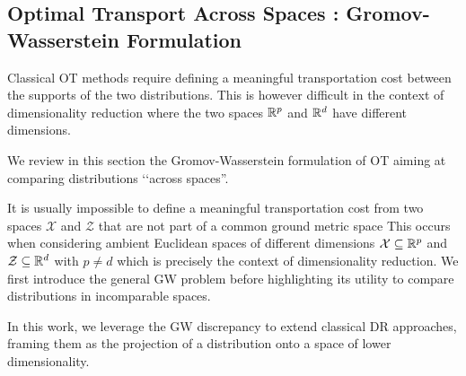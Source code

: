 \subsection{Optimal Transport Across Spaces : Gromov-Wasserstein Formulation}

Classical OT methods require defining a meaningful transportation cost between the supports of the two distributions. 
This is however difficult in the context of dimensionality reduction where the two spaces $\mathbb{R}^p$ and $\mathbb{R}^d$ have different dimensions.

We review in this section the Gromov-Wasserstein formulation of OT aiming at comparing distributions ‘‘across spaces''.

It is usually impossible to define a meaningful transportation cost from two spaces $\mathcal{X}$ and $\mathcal{Z}$ that are not part of a common ground metric space
This occurs when considering ambient Euclidean spaces of different dimensions \ie $\mathcal{X} \subseteq \mathbb{R}^p$ and $\mathcal{Z} \subseteq \mathbb{R}^d$ with $p \neq d$ which is precisely the context of dimensionality reduction.
We first introduce the general GW problem before highlighting its utility to compare distributions in incomparable spaces.

In this work, we leverage the GW discrepancy to extend classical DR approaches, framing them as the projection of a distribution onto a space of lower dimensionality. 

